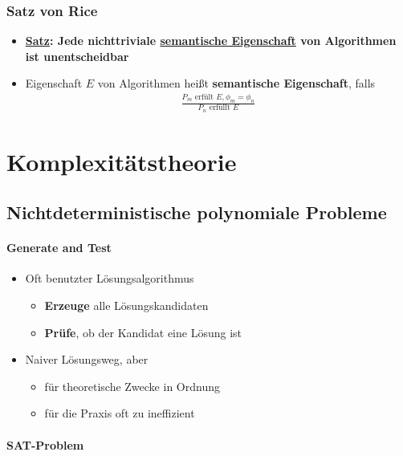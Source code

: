 \documentclass{scrartcl}
\begin{document}
\subsubsection{Satz von Rice}

\begin{itemize}
	\item \textbf{\underline{Satz}: Jede nichttriviale \underline{semantische Eigenschaft} von Algorithmen ist unentscheidbar}
	\item Eigenschaft $E$ von Algorithmen heißt \textbf{semantische Eigenschaft}, falls
	\begin{align*}
		\frac{P_m \text{ erfült } E, \phi_m = \phi_n}{P_n \text{ erfüllt } E}
	\end{align*}
\end{itemize}

\pagebreak
\section{Komplexitätstheorie}

\subsection{Nichtdeterministische polynomiale Probleme}

\paragraph{Generate and Test}

\begin{itemize}
	\item Oft benutzter Lösungsalgorithmus
	\begin{itemize}
		\item \textbf{Erzeuge} alle Lösungskandidaten
		\item \textbf{Prüfe}, ob der Kandidat eine Lösung ist
	\end{itemize}
	\item Naiver Lösungsweg, aber
	\begin{itemize}
		\item für theoretische Zwecke in Ordnung
		\item für die Praxis oft zu ineffizient
	\end{itemize}
\end{itemize}

\paragraph{SAT-Problem}
\end{document}
